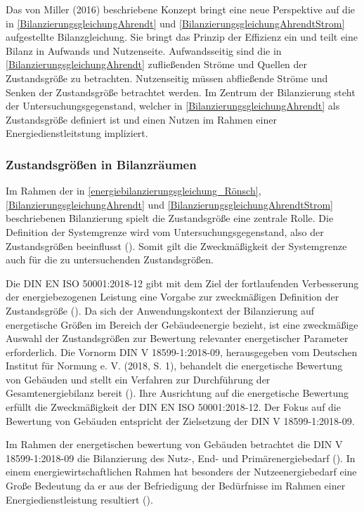 Das von Miller (2016) beschriebene Konzept bringt eine neue Perspektive auf die in \eqref{BilanzierungsgleichungAhrendt} und \eqref{BilanzierungsgleichungAhrendtStrom} 
aufgestellte Bilanzgleichung. Sie bringt das Prinzip der Effizienz ein und teilt eine Bilanz in Aufwands und Nutzenseite. 
Aufwandsseitig sind die in \eqref{BilanzierungsgleichungAhrendt} zufließenden Ströme und Quellen der Zustandsgröße zu betrachten. 
Nutzenseitig müssen abfließende Ströme und Senken der Zustandsgröße betrachtet werden. Im Zentrum der Bilanzierung steht der Untersuchungsgegenstand, welcher in 
\eqref{BilanzierungsgleichungAhrendt} als Zustandsgröße definiert ist und einen Nutzen im Rahmen einer Energiedienstleitstung impliziert. 


\subsubsection{Zustandsgrößen in Bilanzräumen}
Im Rahmen der in \eqref{energiebilanzierungsgleichung_Rönsch}, \eqref{BilanzierungsgleichungAhrendt} und \eqref{BilanzierungsgleichungAhrendtStrom} beschriebenen Bilanzierung 
spielt die Zustandsgröße eine zentrale Rolle. 
Die Definition der Systemgrenze wird vom Untersuchungsgegenstand, also der Zustandsgrößen beeinflusst (\cite[S. 109]{Miller.2016}). Somit gilt die Zweckmäßigkeit der Systemgrenze 
auch für die zu untersuchenden Zustandsgrößen.

Die DIN EN ISO 50001:2018-12 gibt mit dem Ziel der fortlaufenden Verbesserung der energiebezogenen Leistung eine Vorgabe zur zweckmäßigen Definition der Zustandsgröße 
(\cite[S. 11]{DIN50001.2018}).
Da sich der Anwendungskontext der Bilanzierung auf energetische Größen im Bereich der Gebäudeenergie bezieht, ist eine zweckmäßige Auswahl der Zustandsgrößen zur Bewertung 
relevanter energetischer Parameter erforderlich.
Die Vornorm DIN V 18599-1:2018-09, herausgegeben vom Deutschen Institut für Normung e. V. (2018, S. 1), behandelt die energetische Bewertung von Gebäuden und stellt ein 
Verfahren zur Durchführung der Gesamtenergiebilanz bereit (\cite[S. 9]{DIN18599.2018}). Ihre Ausrichtung auf die energetische Bewertung erfüllt die Zweckmäßigkeit der 
DIN EN ISO 50001:2018-12. Der Fokus auf die Bewertung von Gebäuden entspricht der Zielsetzung der DIN V 18599-1:2018-09. 

Im Rahmen der energetischen bewertung von Gebäuden betrachtet die DIN V 18599-1:2018-09 die Bilanzierung des Nutz-, End- und Primärenergiebedarf (\cite{DIN18599.2018}).
In einem energiewirtschaftlichen Rahmen hat besonders der Nutzeenergiebedarf eine Große Bedeutung da er aus der Befriedigung der Bedürfnisse im Rahmen einer 
Energiedienstleistung resultiert (\cite[S. 107]{Miller.2016}).

